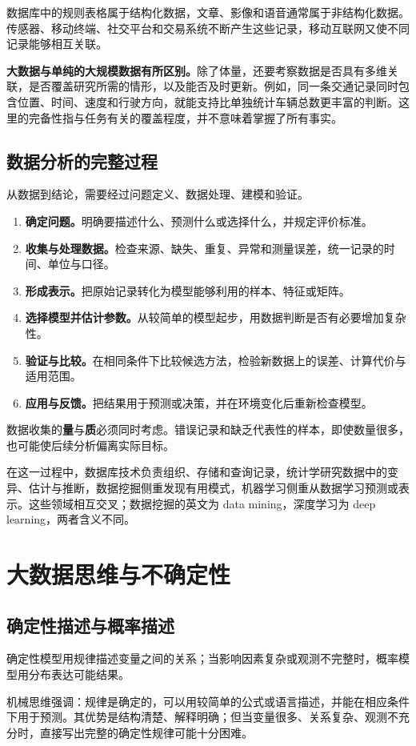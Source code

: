 \documentclass[UTF8,fontset=fandol,a4paper,12pt]{ctexart}
\theoremstyle{definition}
\begin{document}
数据库中的规则表格属于结构化数据，文章、影像和语音通常属于非结构化数据。传感器、移动终端、社交平台和交易系统不断产生这些记录，移动互联网又使不同记录能够相互关联。

\textbf{大数据与单纯的大规模数据有所区别。}除了体量，还要考察数据是否具有多维关联，是否覆盖研究所需的情形，以及能否及时更新。例如，同一条交通记录同时包含位置、时间、速度和行驶方向，就能支持比单独统计车辆总数更丰富的判断。这里的完备性指与任务有关的覆盖程度，并不意味着掌握了所有事实。

\subsection{数据分析的完整过程}
从数据到结论，需要经过问题定义、数据处理、建模和验证。
\begin{enumerate}
\item \textbf{确定问题。}明确要描述什么、预测什么或选择什么，并规定评价标准。
\item \textbf{收集与处理数据。}检查来源、缺失、重复、异常和测量误差，统一记录的时间、单位与口径。
\item \textbf{形成表示。}把原始记录转化为模型能够利用的样本、特征或矩阵。
\item \textbf{选择模型并估计参数。}从较简单的模型起步，用数据判断是否有必要增加复杂性。
\item \textbf{验证与比较。}在相同条件下比较候选方法，检验新数据上的误差、计算代价与适用范围。
\item \textbf{应用与反馈。}把结果用于预测或决策，并在环境变化后重新检查模型。
\end{enumerate}
数据收集的\textbf{量}与\textbf{质}必须同时考虑。错误记录和缺乏代表性的样本，即使数量很多，也可能使后续分析偏离实际目标。

在这一过程中，数据库技术负责组织、存储和查询记录，统计学研究数据中的变异、估计与推断，数据挖掘侧重发现有用模式，机器学习侧重从数据学习预测或表示。这些领域相互交叉；数据挖掘的英文为 data mining，深度学习为 deep learning，两者含义不同。

\section{大数据思维与不确定性}
\subsection{确定性描述与概率描述}
确定性模型用规律描述变量之间的关系；当影响因素复杂或观测不完整时，概率模型用分布表达可能结果。

机械思维强调：规律是确定的，可以用较简单的公式或语言描述，并能在相应条件下用于预测。其优势是结构清楚、解释明确；但当变量很多、关系复杂、观测不充分时，直接写出完整的确定性规律可能十分困难。
\end{document}
